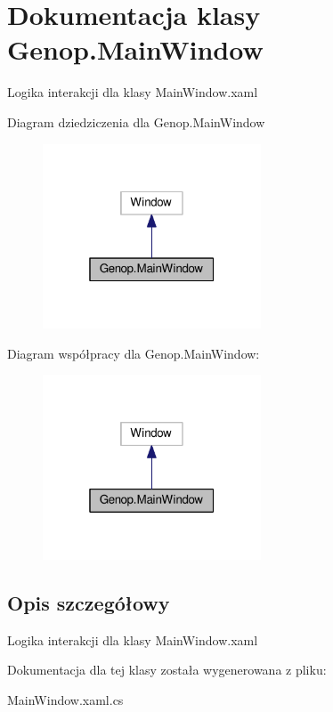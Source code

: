 \hypertarget{classGenop_1_1MainWindow}{}\section{Dokumentacja klasy Genop.\+Main\+Window}
\label{classGenop_1_1MainWindow}


Logika interakcji dla klasy Main\+Window.\+xaml  




Diagram dziedziczenia dla Genop.\+Main\+Window
\nopagebreak
\begin{figure}[H]
\begin{center}
\leavevmode
\includegraphics[width=184pt]{db/d3a/classGenop_1_1MainWindow__inherit__graph}
\end{center}
\end{figure}


Diagram współpracy dla Genop.\+Main\+Window\+:
\nopagebreak
\begin{figure}[H]
\begin{center}
\leavevmode
\includegraphics[width=184pt]{df/d6f/classGenop_1_1MainWindow__coll__graph}
\end{center}
\end{figure}


\subsection{Opis szczegółowy}
Logika interakcji dla klasy Main\+Window.\+xaml 



Dokumentacja dla tej klasy została wygenerowana z pliku\+:\begin{DoxyCompactItemize}
\item 
Main\+Window.\+xaml.\+cs\end{DoxyCompactItemize}

